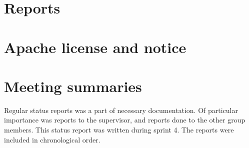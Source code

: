 \section{Reports}



\section{Apache license and notice}
\label{appendix:license}

\section{Meeting summaries}
Regular status reports was a part of necessary documentation. Of particular importance was reports to the supervisor, and reports done to the other group members. This status report was written during sprint 4. The reports were included in chronological order.










